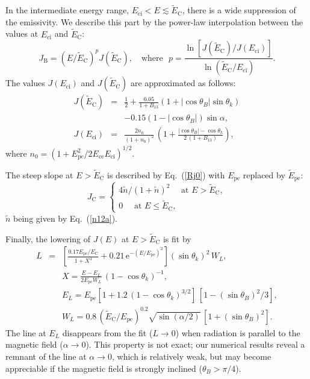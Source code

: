 \documentclass{aa}
\newcommand{\beq}{\begin{equation}}
\newcommand{\eeq}{\end{equation}}
\newcommand{\bea}{\begin{eqnarray}}
\newcommand{\eea}{\end{eqnarray}}
\newcommand{\req}[1]{Eq.~(\ref{#1})}
\newcommand{\EC}{E_\mathrm{C}}
\newcommand{\Ece}{E_\mathrm{ce}}
\newcommand{\Eci}{E_\mathrm{ci}}
\newcommand{\Epe}{E_\mathrm{pe}}
\newcommand{\tEC}{\tilde{E}_\mathrm{C}}
\newcommand{\tEpe}{\tilde{E}_\mathrm{pe}}
\begin{document}
In the intermediate energy range, $\Eci<E\lesssim\tEC$,
there is a wide suppression of the emissivity. We describe this
part by the power-law interpolation between the values at
$\Eci$ and $\tEC$:
\beq
   J_\mathrm{B} = (E/\tEC)^p J(\tEC),
\quad\textrm{where~~}
   p=\frac{\ln[J(\tEC)/J(\Eci)]}{\ln(\tEC/\Eci)}.
\label{JB}
\eeq
The values $J(\Eci)$ and $J(\tEC)$ are approximated as follows:
\bea
   J(\tEC) &=& \frac12
    + \frac{0.05}{1+B_{13}}
      (1+|\cos\theta_B|\sin\theta_k)
\nonumber\\&&
        - 0.15(1-|\cos\theta_B|)\sin\alpha,
\\
   J(\Eci) & = & \frac{2 n_0}{(1+n_0)^2}\,
         \left(
      1 + \frac{|\cos\theta_B|-\cos\theta_k}{2\,(1 + B_{13})}
         \right),
\eea
where
$
   n_0 = ( 1 + {\Epe^2}/{2\Ece\Eci} )^{1/2}.
$

The steep slope at $E>\tEC$ is described by \req{Rj0}
with $\Epe$ replaced by $\tEpe$:
\beq
   J_\mathrm{C} = \left\{ \begin{array}{l}
       4\tilde{n}/(1+\tilde{n})^2
         \quad\mbox{ at } E > \tEC, \\
         0\quad\mbox{ at } E \leqslant \tEC,
      \end{array} \right.
\label{JC}
\eeq
$\tilde{n}$ being given by \req{n12a}.

Finally, the lowering
of $J(E)$ at $E>\tEC$ is fit by
\bea
   {L} &=& \left[
    \frac{0.17\Epe/\EC
          }{1+X^4}
        +0.21\,\mathrm{e}^{-(E/\Epe)^2}
        \right] (\sin\theta_k)^2\,W_L,
\label{L}
\\&&
   X = \frac{E-E_L}{2\Epe W_L}\,(1-\cos\theta_k)^{-1},
\nonumber\\&&
   E_L=\Epe\left[ 1+1.2\,(1-\cos\theta_k)^{3/2} \right]
      \,\left[ 1-(\sin\theta_B)^2/3 \right],
\nonumber\\&&
   W_L = 0.8\,(\tEC/\Epe)^{0.2}
     \sqrt{\sin(\alpha/2)}\, \left[ 1+(\sin\theta_B)^2 \right].
\nonumber\eea
The line at $E_L$ disappears from the fit 
($L\to0$) when radiation is parallel to the
magnetic field ($\alpha\to0$). This property is not exact;
our numerical results reveal a remnant of the 
line at $\alpha\to0$, which is relatively weak,
but may become appreciable
if the magnetic field is strongly inclined ($\theta_B>\pi/4$).
\end{document}
